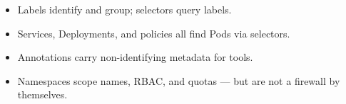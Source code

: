 \begin{recap}
\begin{itemize}
  \item Labels identify and group; selectors query labels.
  \item Services, Deployments, and policies all find Pods via selectors.
  \item Annotations carry non-identifying metadata for tools.
  \item Namespaces scope names, RBAC, and quotas --- but are not a firewall by themselves.
\end{itemize}
\end{recap}
